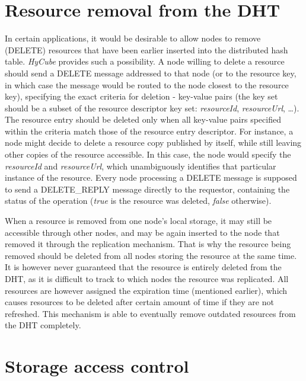 \section{Resource removal from the DHT}

In certain applications, it would be desirable to allow nodes to remove (DELETE) resources that have been earlier inserted into the distributed hash table. \emph{HyCube} provides such a possibility. A node willing to delete a resource should send a DELETE message addressed to that node (or to the resource key, in which case the message would be routed to the node closest to the resource key), specifying the exact criteria for deletion - key-value pairs (the key set should be a subset of the resource descriptor key set: \emph{resourceId}, \emph{resourceUrl}, \ldots). The resource entry should be deleted only when all key-value pairs specified within the criteria match those of the resource entry descriptor. For instance, a node might decide to delete a resource copy published by itself, while still leaving other copies of the resource accessible. In this case, the node would specify the \emph{resourceId} and \emph{resourceUrl}, which unambiguously identifies that particular instance of the resource. Every node processing a DELETE message is supposed to send a DELETE\_REPLY message directly to the requestor, containing the status of the operation (\emph{true} is the resource was deleted, \emph{false} otherwise).

When a resource is removed from one node's local storage, it may still be accessible through other nodes, and may be again inserted to the node that removed it through the replication mechanism. That is why the resource being removed should be deleted from all nodes storing the resource at the same time. It is however never guaranteed that the resource is entirely deleted from the DHT, as it is difficult to track to which nodes the resource was replicated. All resources are however assigned the expiration time (mentioned earlier), which causes resources to be deleted after certain amount of time if they are not refreshed. This mechanism is able to eventually remove outdated resources from the DHT completely.






\section{Storage access control}

